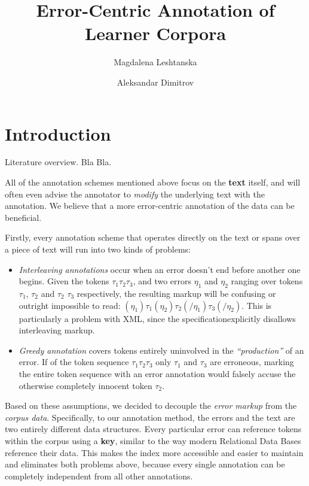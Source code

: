 \documentclass[12pt]{scrartcl}
\author{Magdalena Leshtanska \and Aleksandar Dimitrov}
\title{Error-Centric Annotation of Learner Corpora}
\begin{document}
\maketitle

\newtheorem{thm}{Theorem}[section]
\newtheorem{definition}[thm]{Definition}

\tableofcontents
{}
\section{Introduction}\label{sec:intro}

Literature overview. Bla Bla.

All of the annotation schemes mentioned above focus on the \textbf{text} itself,
and will often even advise the annotator to \textit{modify} the underlying text
with the annotation. We believe that a more error-centric annotation of the data
can be beneficial.

Firstly, every annotation scheme that operates directly on the text or spans
over a piece of text will run into two kinds of problems:

\begin{itemize}
\item \textit{Interleaving annotations} occur when an error doesn't end before
another one begins. Given the tokens $\tau_1 \tau_2 \tau_3$, and two errors
$\eta_1$ and
$\eta_2$ ranging over tokens $\tau_1$, $\tau_2$ and $\tau_2$ $\tau_3$ respectively, the
resulting markup will be confusing or outright impossible to read: $(\eta_1)\tau_1
(\eta_2)\tau_2(/\eta_1)\tau_3(/\eta_2)$. This is particularly a problem with XML,
since the specification\footnotemark explicitly disallows interleaving
markup.
\item \textit{Greedy annotation} covers tokens entirely uninvolved in the
\textit{``production''} of an error. If of the token sequence $\tau_1 \tau_2
\tau_3$ only $\tau_1$
and $\tau_3$ are erroneous,
marking the entire token sequence with an error annotation would falsely accuse
the
otherwise completely innocent token $\tau_2$.
\end{itemize}

Based on these assumptions, we decided to decouple the \textit{error markup}
from the \textit{corpus data}. Specifically, to our annotation method, the
errors and the text are two entirely different data structures. Every
particular error can reference tokens within the corpus using a \textbf{key},
similar to the way modern Relational Data Bases reference their data. This makes
the index more accessible and easier to maintain and eliminates both problems
above, because every single annotation can be completely independent from all
other annotations.
\end{document}
